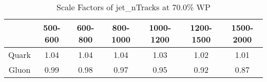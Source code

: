 \begin{table}
\centering
\caption{Scale Factors of jet_nTracks at 70.0\% WP}
\label{tab:jet_nTracks_0.7_Gluon}
\begin{tabular}{ccccccc}
\toprule
{} &  500-600 &  600-800 &  800-1000 &  1000-1200 &  1200-1500 &  1500-2000 \\
\midrule
Quark &     1.04 &     1.04 &      1.04 &       1.03 &       1.02 &       1.01 \\
Gluon &     0.99 &     0.98 &      0.97 &       0.95 &       0.92 &       0.87 \\
\bottomrule
\end{tabular}
\end{table}
